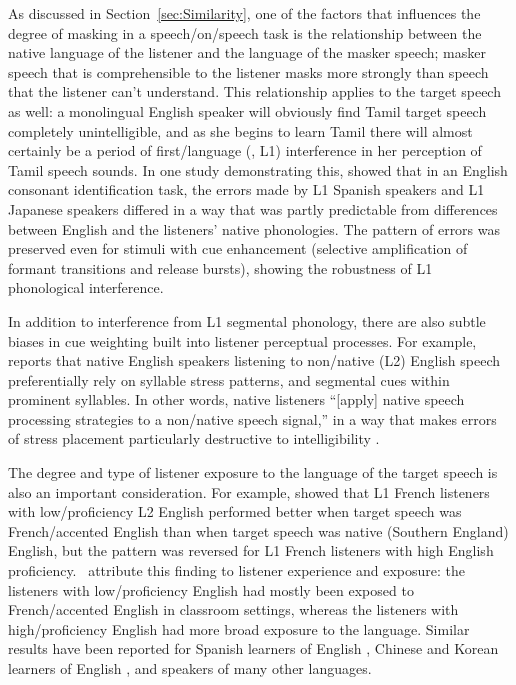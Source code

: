 As discussed in Section~\ref{sec:Similarity}, one of the factors that influences the degree of masking in a speech\-/on\-/speech task is the relationship between the native language of the listener and the language of the masker speech; masker speech that is comprehensible to the listener masks more strongly than speech that the listener can’t understand.  This relationship applies to the target speech as well: a monolingual English speaker will obviously find Tamil target speech completely unintelligible, and as she begins to learn Tamil there will almost certainly be a period of first\-/language (\aka, L1) interference in her perception of Tamil speech sounds.  In one study demonstrating this, \citet{HazanSimpson2000} showed that in an English consonant identification task, the errors made by L1 Spanish speakers and L1 Japanese speakers differed in a way that was partly predictable from differences between English and the listeners’ native phonologies.  The pattern of errors was preserved even for stimuli with cue enhancement (selective amplification of formant transitions and release bursts), showing the robustness of L1 phonological interference.

In addition to interference from L1 segmental phonology, there are also subtle biases in cue weighting built into listener perceptual processes.  For example, \citeauthor*{Zielinski2008} reports that native English speakers listening to non\-/native (L2) English speech preferentially rely on syllable stress patterns, and segmental cues within prominent syllables.  In other words, native listeners “[apply] native speech processing strategies to a non\-/native speech signal,” in a way that makes errors of stress placement particularly destructive to intelligibility \citep[80]{Zielinski2008}.

The degree and type of listener exposure to the language of the target speech is also an important consideration.  For example, \citet{PinetEtAl2011} showed that L1 French listeners with low\-/proficiency L2 English performed better when target speech was French\-/accented English than when target speech was native (Southern England) English, but the pattern was reversed for L1 French listeners with high English proficiency.  \citeauthor*{PinetEtAl2011}\ attribute this finding to listener experience and exposure: the listeners with low\-/proficiency English had mostly been exposed to French\-/accented English in classroom settings, whereas the listeners with high\-/proficiency English had more broad exposure to the language.  Similar results have been reported for Spanish learners of English \citep{ImaiEtAl2005}, Chinese and Korean learners of English \citep{BentBradlow2003}, and speakers of many other languages.%

